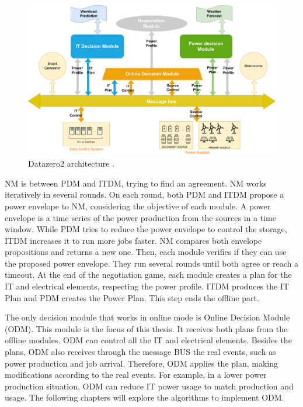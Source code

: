 \begin{figure}[!htb]
    \centering
    \includegraphics[scale=0.45]{Images/Model/model.pdf}
    \caption[Datazero2 architecture.]{Datazero2 architecture \cite{Datazero}.}
    \label{fig:model}
\end{figure}

NM is between PDM and ITDM, trying to find an agreement. NM works iteratively in several rounds. On each round, both PDM and ITDM propose a power envelope to NM, considering the objective of each module. A power envelope is a time series of the power production from the sources in a time window. While PDM tries to reduce the power envelope to control the storage, ITDM increases it to run more jobs faster. NM compares both envelope propositions and returns a new one. Then, each module verifies if they can use the proposed power envelope. They run several rounds until both agree or reach a timeout. At the end of the negotiation game, each module creates a plan for the IT and electrical elements, respecting the power profile. ITDM produces the IT Plan and PDM creates the Power Plan. This step ends the offline part. 

The only decision module that works in online mode is Online Decision Module (ODM). This module is the focus of this thesis. It receives both plans from the offline modules. ODM can control all the IT and electrical elements. Besides the plans, ODM also receives through the message BUS the real events, such as power production and job arrival. Therefore, ODM applies the plan, making modifications according to the real events. For example, in a lower power production situation, ODM can reduce IT power usage to match production and usage. The following chapters will explore the algorithms to implement ODM.

